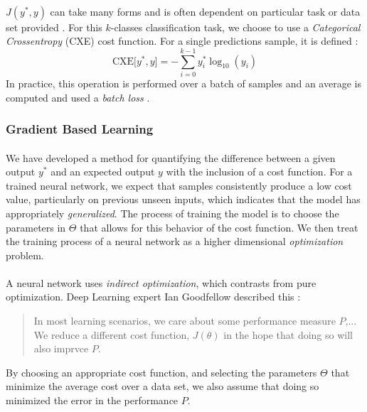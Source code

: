 \documentclass[12pt,letterpaper]{article}
\begin{document}
\paragraph*{}$J(y^*,y)$ can take many forms and is often dependent on particular task or data set provided \cite{James}. For this $k$-classes classification task, we choose to use a \textit{Categorical Crossentropy} (CXE) cost function. For a single predictions sample, it is defined \cite{Goodfellow}:
\begin{equation}
\label{eqn-CategoricalCrossentropy}
\text{CXE}\big[ y^* , y \big] = - \sum_{i=0}^{k-1} y^*_i \log_{10}(y_i) 
\end{equation}
In practice, this operation is performed over a batch of samples and an average is computed and used a \textit{batch loss} \cite{Goodfellow}.


\subsubsection{Gradient Based Learning}

\paragraph*{}We have developed a method for quantifying the difference between a given output $y^*$ and an expected output $y$ with the inclusion of a cost function. For a trained neural network, we expect that samples consistently produce a low cost value, particularly on previous unseen inputs, which indicates that the model has appropriately \textit{generalized}. The process of training the model is to choose the parameters in $\Theta$ that allows for this behavior of the cost function. We then treat the training process of a neural network as a higher dimensional \textit{optimization} problem.

\paragraph*{}A neural network uses \textit{indirect optimization}, which contrasts from pure optimization. Deep Learning expert Ian Goodfellow described this \cite{Goodfellow}:
\begin{quote}
In most learning scenarios, we care about some performance measure $P$,... We reduce a different cost function, $J(\theta)$ in the hope that doing so will also imprvce $P$.
\end{quote}
By choosing an appropriate cost function, and selecting the parameters $\Theta$ that minimize the average cost over a data set, we also assume that doing so minimized the error in the performance $P$.
\end{document}
